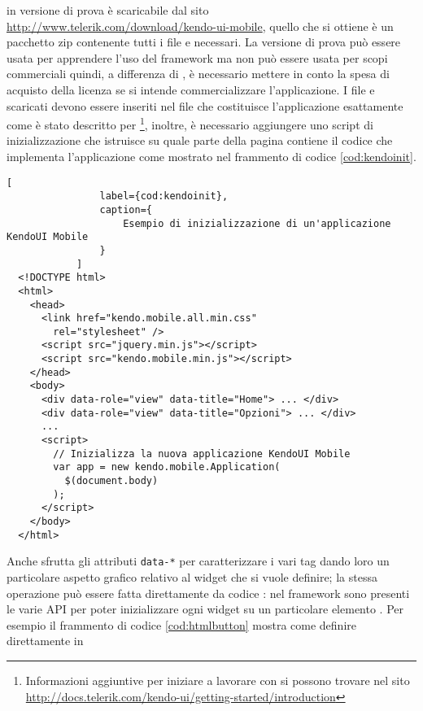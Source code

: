             \kendomob{} in versione di prova è scaricabile dal sito
            \url{http://www.telerik.com/download/kendo-ui-mobile}, quello che si
            ottiene è un pacchetto zip contenente tutti i file \js{} e \css{}
            necessari. La versione di prova può essere usata per apprendere
            l'uso del frame\-work ma non può essere usata per scopi commerciali
            quindi, a differenza di \jqm{}, è necessario    mettere in conto
            la spesa di acquisto della licenza se si intende commercializzare
            l'applicazione. I file \js{} e \css{} scaricati devono essere
            inseriti nel file \html{} che costituisce l'applicazione esattamente
            come è stato descritto per \jqm{}\footnote{Informazioni
            aggiuntive per iniziare a lavorare con \kendomob{} si possono
            trovare nel sito \url{http://docs.telerik.com/kendo-ui/getting-started/introduction}},
            inoltre, è necessario aggiungere uno script di inizializzazione che
            istruisce \kendomob{} su quale parte della pagina \html{} contiene il
            codice che implementa l'applicazione come mostrato nel frammento di
            codice \ref{cod:kendoinit}.
            \begin{lstlisting}[
                label={cod:kendoinit},
                caption={
                    Esempio di inizializzazione di un'applicazione KendoUI Mobile
                }
            ]
  <!DOCTYPE html>
  <html>
    <head>
      <link href="kendo.mobile.all.min.css"
        rel="stylesheet" />
      <script src="jquery.min.js"></script>
      <script src="kendo.mobile.min.js"></script>
    </head>
    <body>
      <div data-role="view" data-title="Home"> ... </div>
      <div data-role="view" data-title="Opzioni"> ... </div>
      ...
      <script>
        // Inizializza la nuova applicazione KendoUI Mobile
        var app = new kendo.mobile.Application(
          $(document.body)
        );
      </script>
    </body>
  </html>
            \end{lstlisting}
            Anche \kendomob{} sfrutta gli attributi \verb|data-*| per
            caratterizzare i vari tag \html{} dando loro un particolare aspetto
            grafico relativo al widget che si vuole definire; la stessa
            operazione può essere fatta direttamente da codice \js{}: nel
            frame\-work sono presenti le varie API per poter inizializzare ogni
            widget su un particolare elemento \html{}. Per esempio il frammento di
            codice \ref{cod:htmlbutton} mostra come definire direttamente in
